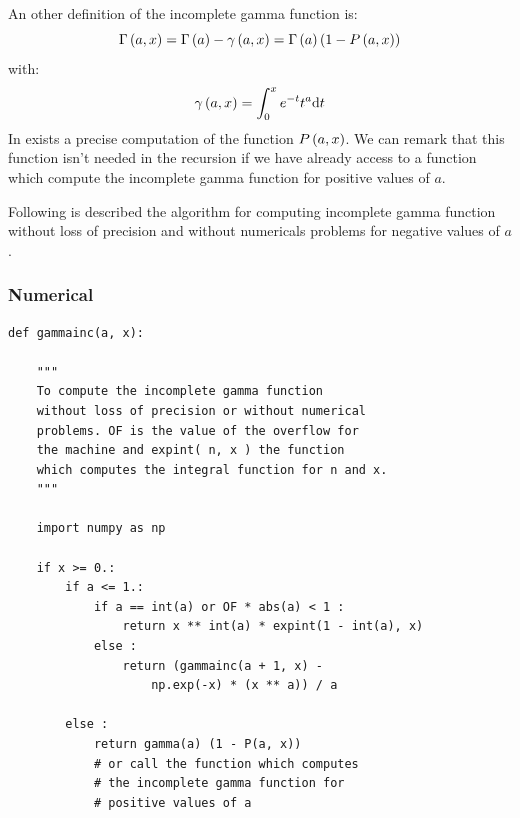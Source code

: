 An other definition of the incomplete gamma function is:
%
\begin{equation}
    \Gamma\left({a,x}\right)=\Gamma\left({a}\right)-\gamma\left({a,x}\right)=\Gamma\left({a}\right)\left({1-P\left({a,x}\right)}\right)
\end{equation}
%
with:
%
\begin{equation}
    \gamma\left({a,x}\right)=\int_0^x{e^{-t}{t^{a}}{\rm{d}}{t}}
\end{equation}
%
In \citet{NumericalRecipes} exists a precise computation of the function
$P\left({a,x}\right)$. We can remark that this function isn't needed in the recursion
if we have already access to a function which compute the incomplete gamma
function for positive values of $a$.

Following is described the algorithm for computing incomplete gamma function
without loss of precision and without numericals problems for negative values
of $a$.
%
\subsubsection{Numerical}
%
\begin{verbatim}
def gammainc(a, x):

    """
    To compute the incomplete gamma function
    without loss of precision or without numerical
    problems. OF is the value of the overflow for
    the machine and expint( n, x ) the function
    which computes the integral function for n and x.
    """

    import numpy as np

    if x >= 0.:
        if a <= 1.:
            if a == int(a) or OF * abs(a) < 1 :
                return x ** int(a) * expint(1 - int(a), x)
            else :
                return (gammainc(a + 1, x) -
                    np.exp(-x) * (x ** a)) / a

        else :
            return gamma(a) (1 - P(a, x))
            # or call the function which computes
            # the incomplete gamma function for
            # positive values of a
\end{verbatim}
